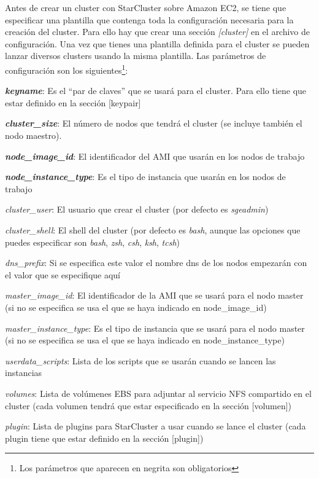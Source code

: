 \documentclass{article}
\begin{document}
	Antes de crear un cluster con StarCluster sobre Amazon EC2, se tiene que especificar una plantilla que contenga toda la configuración necesaria para la creación del cluster. Para ello hay que crear una sección \emph{[cluster]} en el archivo de configuración. Una vez que tienes una plantilla definida para el cluster se pueden lanzar diversos clusters usando la misma plantilla. Las parámetros de configuración son los siguientes\footnote{Los parámetros que aparecen en negrita son obligatorios}:
{\setlength{\parskip}{0mm} \begin{itemize}
{\setlength{\parskip}{0mm}
	\item 	\textbf{\emph{keyname}}: Es el ``par de claves'' que se usará para el cluster. Para ello tiene que estar definido en la sección [keypair]
	\item \textbf{\emph{cluster\_size}}: El número de nodos que tendrá el cluster (se incluye también el nodo maestro).
	\item \textbf{\emph{node\_image\_id}}: El identificador del AMI que usarán en los nodos de trabajo
	\item \textbf{\emph{node\_instance\_type}}: Es el tipo de instancia que usarán en los nodos de trabajo
	\item \emph{cluster\_user}: El usuario que crear el cluster (por defecto es \emph{sgeadmin})
	\item \emph{cluster\_shell}: El shell del cluster (por defecto es \emph{bash}, aunque las opciones que puedes especificar son \emph{bash}, \emph{zsh}, \emph{csh}, \emph{ksh}, \emph{tcsh})
	\item \emph{dns\_prefix}: Si se especifica este valor el nombre dns de los nodos empezarán con el valor que se especifique aquí
	\item \emph{master\_image\_id}: El identificador de la AMI que se usará para el nodo master (si no se especifica se usa el que se haya indicado en node\_image\_id)
	\item \emph{master\_instance\_type}: Es el tipo de instancia que se usará para el nodo master (si no se especifica se usa el que se haya indicado en node\_instance\_type)
	\item \emph{userdata\_scripts}: Lista de los scripts que se usarán cuando se lancen las instancias
	\item \emph{volumes}: Lista de volúmenes EBS para adjuntar al servicio NFS compartido en el cluster (cada volumen tendrá que estar especificado en la sección [volumen])
	\item \emph{plugin}: Lista de plugins para StarCluster a usar cuando se lance el cluster (cada plugin tiene que estar definido en la sección [plugin])
}
\end{itemize}}
\end{document}
